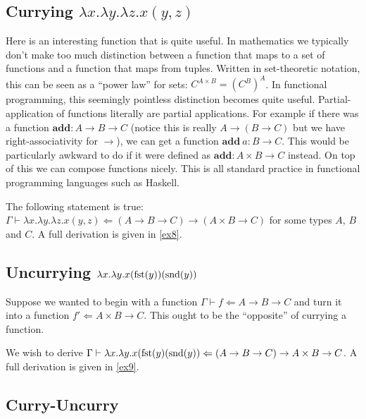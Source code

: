 \subsection{Currying \texorpdfstring{$\lambda x . \lambda y . \lambda z . x (y, z)$}{}} %
Here is an interesting function that is quite useful. In mathematics we typically don't make too much distinction between a function that maps to a set of functions and a function that maps from tuples. Written in set-theoretic notation, this can be seen as a ``power law'' for sets: $C^{A \times B} = \left (C^B \right )^A$.
    In functional programming, this seemingly pointless distinction becomes quite useful. Partial-application of functions literally are partial applications. For example if there was a function $\mathbf{add} : A \to B \to C$ (notice this is really $A \to (B \to C)$ but we have right-associativity for $\to$), we can get a function $\mathbf{add}\ a : B \to C$. This would be particularly awkward to do if it were defined as $\mathbf{add} : A \times B \to C$ instead. On top of this we can compose functions nicely. This is all standard practice in functional programming languages such as Haskell.
    
\begin{example}\label{curry}
    The following statement is true: $\Gamma \vdash \lambda x . \lambda y . \lambda z . x ( y , z) \Leftarrow (A \to B \to C) \to (A \times B \to C)$ for some types $A$, $B$ and $C$. A full derivation is given in \ref{ex8}.
\end{example}

\subsection{Uncurrying \texorpdfstring{$\lambda x . \lambda y . x (\mathrm{fst}(y))(\mathrm{snd}(y))$}{}} %

Suppose we wanted to begin with a function $\Gamma \vdash f \Leftarrow A \to B \to C$ and turn it into a function $f' \Leftarrow A \times B \to C$. This ought to be the ``opposite'' of currying a function.

\begin{example}\label{uncurry}
    We wish to derive $\Gamma \vdash \lambda x . \lambda y . x(\mathrm{fst}(y)(\mathrm{snd}(y)) \Leftarrow (A \to B \to C) \to A \times B \to C$. A full derivation is given in \ref{ex9}.
\end{example}

\subsection{Curry-Uncurry}

